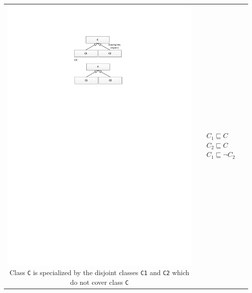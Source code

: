 \documentclass[11pt,final,onecolumn]{report}
\newcommand\umltablespacing{3cm}
\newcommand\dltablespacing{4.5cm}
\begin{document}
\begin{longtable}{|>{\scriptsize}c|>{\scriptsize}l|>{\scriptsize}l|}
\begin{minipage}{\umltablespacing}
      \centering\hspace*{-5.5mm}\includegraphics[trim = 76mm 205mm 72mm 25mm, clip, scale=0.75]{./diagrams/chapter5/IncompleteDisjoint}
      Class \texttt{C} is specialized by the disjoint classes \texttt{C1} and \texttt{C2} which do not cover class \texttt{C}
     \vspace{2mm}
    \end{minipage}
    &
    \begin{minipage}{\dltablespacing}
       $\begin{aligned}    
	  &C_1 \sqsubseteq C  \\  
	  &C_2 \sqsubseteq C \\
	  &C_1 \sqsubseteq \neg C_2
         \end{aligned}$      

\end{minipage}
\end{longtable}
\end{document}
